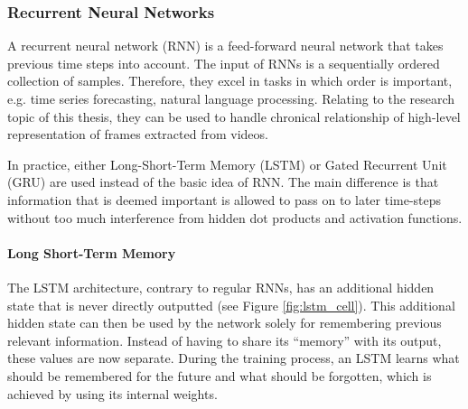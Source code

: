     \subsubsection{Recurrent Neural Networks}
        A recurrent neural network (RNN) is a feed-forward neural network that takes previous time steps into account.
        The input of RNNs is a sequentially ordered collection of samples.
        Therefore, they excel in tasks in which order is important, e.g. time series forecasting, natural language processing.
        Relating to the research topic of this thesis, they can be used to handle chronical relationship of high-level representation of frames extracted from videos.

        In practice, either Long-Short-Term Memory (LSTM) or Gated Recurrent Unit (GRU) are used instead of the basic idea of RNN. 
        The main difference is that information that is deemed important is allowed to pass on to later time-steps without too much interference from hidden dot products and activation functions.

        \paragraph{Long Short-Term Memory}
        The LSTM architecture, contrary to regular RNNs, has an additional hidden state that is never directly outputted (see Figure \ref{fig:lstm_cell}). 
        This additional hidden state can then be used by the network solely for remembering previous relevant information. 
        Instead of having to share its ``memory'' with its output, these values are now separate. 
        During the training process, an LSTM learns what should be remembered for the future and what should be forgotten, which is achieved by using its internal weights.

